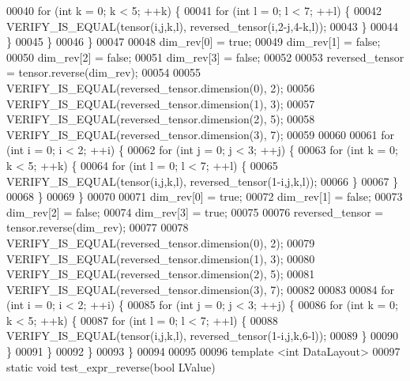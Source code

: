 \begin{DoxyCode}
00040       \textcolor{keywordflow}{for} (\textcolor{keywordtype}{int} k = 0; k < 5; ++k) \{
00041         \textcolor{keywordflow}{for} (\textcolor{keywordtype}{int} l = 0; l < 7; ++l) \{
00042           VERIFY\_IS\_EQUAL(tensor(i,j,k,l), reversed\_tensor(i,2-j,4-k,l));
00043         \}
00044       \}
00045     \}
00046   \}
00047 
00048   dim\_rev[0] = \textcolor{keyword}{true};
00049   dim\_rev[1] = \textcolor{keyword}{false};
00050   dim\_rev[2] = \textcolor{keyword}{false};
00051   dim\_rev[3] = \textcolor{keyword}{false};
00052 
00053   reversed\_tensor = tensor.reverse(dim\_rev);
00054 
00055   VERIFY\_IS\_EQUAL(reversed\_tensor.dimension(0), 2);
00056   VERIFY\_IS\_EQUAL(reversed\_tensor.dimension(1), 3);
00057   VERIFY\_IS\_EQUAL(reversed\_tensor.dimension(2), 5);
00058   VERIFY\_IS\_EQUAL(reversed\_tensor.dimension(3), 7);
00059 
00060 
00061   \textcolor{keywordflow}{for} (\textcolor{keywordtype}{int} i = 0; i < 2; ++i) \{
00062     \textcolor{keywordflow}{for} (\textcolor{keywordtype}{int} j = 0; j < 3; ++j) \{
00063       \textcolor{keywordflow}{for} (\textcolor{keywordtype}{int} k = 0; k < 5; ++k) \{
00064         \textcolor{keywordflow}{for} (\textcolor{keywordtype}{int} l = 0; l < 7; ++l) \{
00065           VERIFY\_IS\_EQUAL(tensor(i,j,k,l), reversed\_tensor(1-i,j,k,l));
00066         \}
00067       \}
00068     \}
00069   \}
00070 
00071   dim\_rev[0] = \textcolor{keyword}{true};
00072   dim\_rev[1] = \textcolor{keyword}{false};
00073   dim\_rev[2] = \textcolor{keyword}{false};
00074   dim\_rev[3] = \textcolor{keyword}{true};
00075 
00076   reversed\_tensor = tensor.reverse(dim\_rev);
00077 
00078   VERIFY\_IS\_EQUAL(reversed\_tensor.dimension(0), 2);
00079   VERIFY\_IS\_EQUAL(reversed\_tensor.dimension(1), 3);
00080   VERIFY\_IS\_EQUAL(reversed\_tensor.dimension(2), 5);
00081   VERIFY\_IS\_EQUAL(reversed\_tensor.dimension(3), 7);
00082 
00083 
00084   \textcolor{keywordflow}{for} (\textcolor{keywordtype}{int} i = 0; i < 2; ++i) \{
00085     \textcolor{keywordflow}{for} (\textcolor{keywordtype}{int} j = 0; j < 3; ++j) \{
00086       \textcolor{keywordflow}{for} (\textcolor{keywordtype}{int} k = 0; k < 5; ++k) \{
00087         \textcolor{keywordflow}{for} (\textcolor{keywordtype}{int} l = 0; l < 7; ++l) \{
00088           VERIFY\_IS\_EQUAL(tensor(i,j,k,l), reversed\_tensor(1-i,j,k,6-l));
00089         \}
00090       \}
00091     \}
00092   \}
00093 \}
00094 
00095 
00096 \textcolor{keyword}{template} <\textcolor{keywordtype}{int} DataLayout>
00097 \textcolor{keyword}{static} \textcolor{keywordtype}{void} test\_expr\_reverse(\textcolor{keywordtype}{bool} LValue)

\end{DoxyCode}

